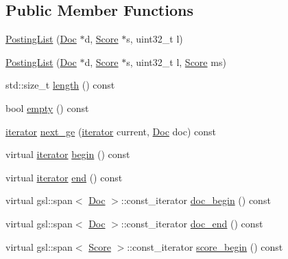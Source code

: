 \subsection*{Public Member Functions}
\begin{DoxyCompactItemize}
\item 
\hyperlink{classbloodhound_1_1PostingList_aec7755e1f3b276b65f474fb1d85620a7}{Posting\+List} (\hyperlink{structbloodhound_1_1Doc}{Doc} $\ast$d, \hyperlink{structbloodhound_1_1Score}{Score} $\ast$s, uint32\+\_\+t l)
\item 
\hyperlink{classbloodhound_1_1PostingList_a725f1df76c8278f1d927fff3ed4c496e}{Posting\+List} (\hyperlink{structbloodhound_1_1Doc}{Doc} $\ast$d, \hyperlink{structbloodhound_1_1Score}{Score} $\ast$s, uint32\+\_\+t l, \hyperlink{structbloodhound_1_1Score}{Score} ms)
\item 
std\+::size\+\_\+t \hyperlink{classbloodhound_1_1PostingList_a7af6f4e9fc277dd7c1dc73c2922ceacd}{length} () const
\item 
bool \hyperlink{classbloodhound_1_1PostingList_a28ec60331aec6acaa9c281d4d412bf26}{empty} () const
\item 
\hyperlink{structbloodhound_1_1PostingList_1_1iterator}{iterator} \hyperlink{classbloodhound_1_1PostingList_abd082192a0339062d318de73c95f1ee5}{next\+\_\+ge} (\hyperlink{structbloodhound_1_1PostingList_1_1iterator}{iterator} current, \hyperlink{structbloodhound_1_1Doc}{Doc} doc) const
\item 
virtual \hyperlink{structbloodhound_1_1PostingList_1_1iterator}{iterator} \hyperlink{classbloodhound_1_1PostingList_a274f57f133cd6763e0d8cc3e00fa1be3}{begin} () const
\item 
virtual \hyperlink{structbloodhound_1_1PostingList_1_1iterator}{iterator} \hyperlink{classbloodhound_1_1PostingList_a2e1f899bd04ae64e1318494d358ade94}{end} () const
\item 
virtual gsl\+::span$<$ \hyperlink{structbloodhound_1_1Doc}{Doc} $>$\+::const\+\_\+iterator \hyperlink{classbloodhound_1_1PostingList_aac3dbe7fbf43ce93031e97b16bcfc888}{doc\+\_\+begin} () const
\item 
virtual gsl\+::span$<$ \hyperlink{structbloodhound_1_1Doc}{Doc} $>$\+::const\+\_\+iterator \hyperlink{classbloodhound_1_1PostingList_aac468540b0a376d9b378a4333546245c}{doc\+\_\+end} () const
\item 
virtual gsl\+::span$<$ \hyperlink{structbloodhound_1_1Score}{Score} $>$\+::const\+\_\+iterator \hyperlink{classbloodhound_1_1PostingList_aec5d5bb81622fb64d7b64416a8491456}{score\+\_\+begin} () const

\end{DoxyCompactItemize}
